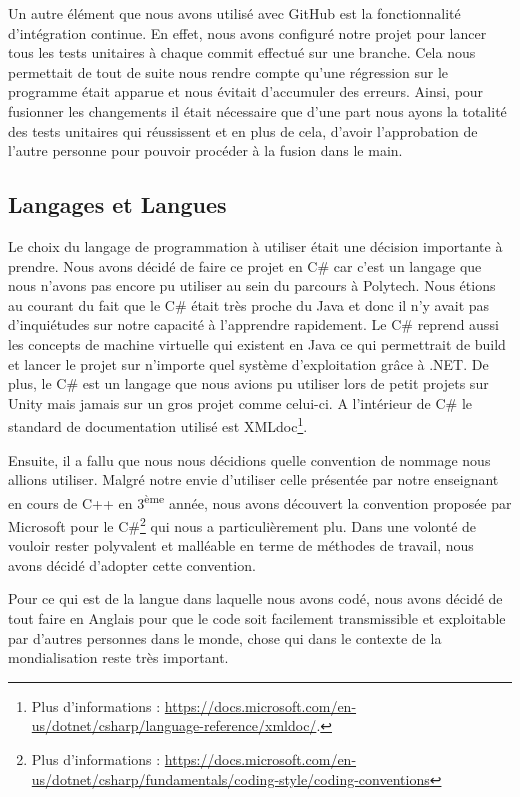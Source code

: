 \documentclass{EPUProjetDi}
\begin{document}
Un autre élément que nous avons utilisé avec GitHub est la fonctionnalité d'intégration continue. En effet, nous avons configuré notre projet 
pour lancer tous les tests unitaires à chaque commit effectué sur une branche.
Cela nous permettait de tout de suite nous rendre compte qu'une régression sur le programme était apparue et nous évitait d'accumuler des erreurs.
Ainsi, pour fusionner les changements il était nécessaire que d'une part nous ayons la totalité des tests unitaires qui réussissent et en plus de cela,
d'avoir l'approbation de l'autre personne pour pouvoir procéder à la fusion dans le main.

\subsection{Langages et Langues}

Le choix du langage de programmation à utiliser était une décision importante à prendre. Nous avons décidé de faire ce projet en C\# car c'est un langage que nous
n'avons pas encore pu utiliser au sein du parcours à Polytech. Nous étions au courant du fait que le C\# était très proche du Java et donc il n'y avait pas
d'inquiétudes sur notre capacité à l'apprendre rapidement. Le C\# reprend aussi les concepts de machine virtuelle qui existent en Java ce qui permettrait de build et lancer le projet
sur n'importe quel système d'exploitation grâce à .NET.
De plus, le C\# est un langage que nous avions pu utiliser lors de petit projets sur Unity mais jamais sur un gros projet comme celui-ci. 
A l'intérieur de C\# le standard de documentation utilisé est XMLdoc\footnote{Plus d'informations : 
\url{https://docs.microsoft.com/en-us/dotnet/csharp/language-reference/xmldoc/}.}.

Ensuite, il a fallu que nous nous décidions quelle convention de nommage nous allions utiliser. 
Malgré notre envie d'utiliser celle présentée par notre enseignant en cours de C++ en 3\textsuperscript{ème} année, nous avons découvert la convention 
proposée par Microsoft pour le C\#\footnote{Plus d'informations : \url{https://docs.microsoft.com/en-us/dotnet/csharp/fundamentals/coding-style/coding-conventions}} qui nous a particulièrement plu.
Dans une volonté de vouloir rester polyvalent et malléable en terme de méthodes de travail, nous avons décidé d'adopter cette convention.

Pour ce qui est de la langue dans laquelle nous avons codé, nous avons décidé de tout faire en Anglais pour que le code soit facilement
transmissible et exploitable par d'autres personnes dans le monde, chose qui dans le contexte de la mondialisation reste très important.
\end{document}
